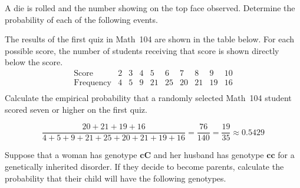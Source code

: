 \documentclass[answers,addpoints,12pt]{exam}
\begin{document}
\begin{questions}

\question[15] A die is rolled and the number
showing on the top face observed. Determine the probability
of each of the following events.
\ifprintanswers\else\newpage\fi

\question[10] The results of the first quiz in Math~104 are
shown in the table below. For each possible score, the number
of students receiving that score is shown directly below
the score.
\[\begin{array}{c|cccccccccc}
\text{Score}&2&3&4&5&6&7&8&9&10\\\hline
\text{Frequency}&4&5&9&21&25&20&21&19&16\\
\end{array}\]
Calculate the empirical probability that a randomly
selected Math~104 student scored seven or higher
on the first quiz.
\begin{solution}[2in]
\[\frac{20+21+19+16}{4+5+9+21+25+20+21+19+16}
=\frac{76}{140}=\frac{19}{35}\approx 0.5429\]
\end{solution}

\question[15] Suppose that a woman has genotype $\mathbold{cC}$
and her husband has genotype $\mathbold{cc}$ for a
genetically inherited disorder.
If they decide to become parents, calculate the
probability that their child will
have the following genotypes.
\end{questions}
\end{document}

